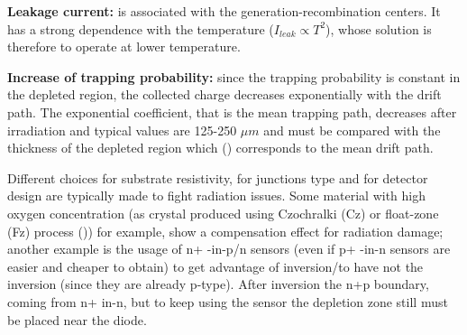     \textbf{Leakage current:} is associated with the generation-recombination centers. It has a strong dependence with the temperature ($I_{leak}\propto T^2$), whose solution is therefore to operate at lower temperature.

    \textbf{Increase of trapping probability:} since the trapping probability is constant in the depleted region, the collected charge decreases exponentially with the drift path. The exponential coefficient, that is the mean trapping path, decreases after irradiation and typical values are 125-250 $\mu m$ and must be compared with the thickness of the depleted region which () corresponds to the mean drift path.

    Different choices for substrate resistivity, for junctions type and for detector design are typically made to fight radiation issues. Some material with high oxygen concentration (as crystal produced using Czochralki (Cz) or float-zone (Fz) process ()) for example, show a compensation effect for radiation damage; another example is the usage of n+ -in-p/n sensors (even if p+ -in-n sensors are easier and cheaper to obtain) to get advantage of inversion/to have not the inversion (since they are already p-type). After inversion the n+p boundary, coming from n+ in-n, but to keep using the sensor the depletion zone still must be placed near the diode.
    
